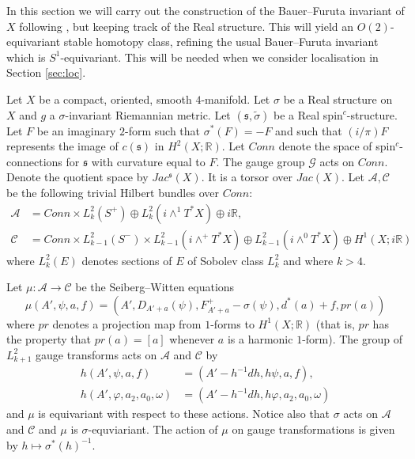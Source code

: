 \documentclass{amsart}
\theoremstyle{definition}
\theoremstyle{remark}
\numberwithin{equation}{section}
\begin{document}
In this section we will carry out the construction of the Bauer--Furuta invariant of $X$ following \cite{bf}, but keeping track of the Real structure. This will yield an $O(2)$-equivariant stable homotopy class, refining the usual Bauer--Furuta invariant which is $S^1$-equivariant. This will be needed when we consider localisation in Section \ref{sec:loc}.

Let $X$ be a compact, oriented, smooth $4$-manifold. Let $\sigma$ be a Real structure on $X$ and $g$ a $\sigma$-invariant Riemannian metric. Let $(\mathfrak{s} , \widetilde{\sigma})$ be a Real spin$^c$-structure. Let $F$ be an imaginary $2$-form such that $\sigma^*(F) = -F$ and such that $(i/\pi)F$ represents the image of $c(\mathfrak{s})$ in $H^2(X ; \mathbb{R})$. Let $Conn$ denote the space of spin$^c$-connections for $\mathfrak{s}$ with curvature equal to $F$. The gauge group $\mathcal{G}$ acts on $Conn$. Denote the quotient space by $Jac^{\mathfrak{s}}(X)$. It is a torsor over $Jac(X)$. Let $\mathcal{A}, \mathcal{C}$ be the following trivial Hilbert bundles over $Conn$:
\begin{align*}
\mathcal{A} &= Conn \times L^2_k(S^+) \oplus L^2_k( i\wedge^1 T^*X) \oplus i\mathbb{R}, \\
\mathcal{C} &= Conn \times L^2_{k-1}(S^-) \times L^2_{k-1}( i \wedge^+ T^*X) \oplus L^2_{k-1}( i\wedge^0 T^*X) \oplus H^1(X ; i\mathbb{R})
\end{align*}
where $L^2_k(E)$ denotes sections of $E$ of Sobolev class $L^2_k$ and where $k > 4$.

Let $\mu : \mathcal{A} \to \mathcal{C}$ be the Seiberg--Witten equations
\[
\mu( A' , \psi , a , f ) = ( A' , D_{A'+a}(\psi) , F^+_{A'+a} - \sigma(\psi) , d^*(a) + f , pr(a) )
\]
where $pr$ denotes a projection map from $1$-forms to $H^1(X ; \mathbb{R})$ (that is, $pr$ has the property that $pr(a) = [a]$ whenever $a$ is a harmonic $1$-form). The group of $L^2_{k+1}$ gauge transforms acts on $\mathcal{A}$ and $\mathcal{C}$ by
\begin{align*}
h(A' , \psi , a , f) &= (A' - h^{-1}dh , h \psi , a , f ), \\
h(A' , \varphi , a_2 , a_0 , \omega) &= (A' - h^{-1}dh , h \varphi , a_2 , a_0 , \omega )
\end{align*}
and $\mu$ is equivariant with respect to these actions. Notice also that $\sigma$ acts on $\mathcal{A}$ and $\mathcal{C}$ and $\mu$ is $\sigma$-equviariant. The action of $\mu$ on gauge transformations is given by $h \mapsto \sigma^*(h)^{-1}$.
\end{document}

